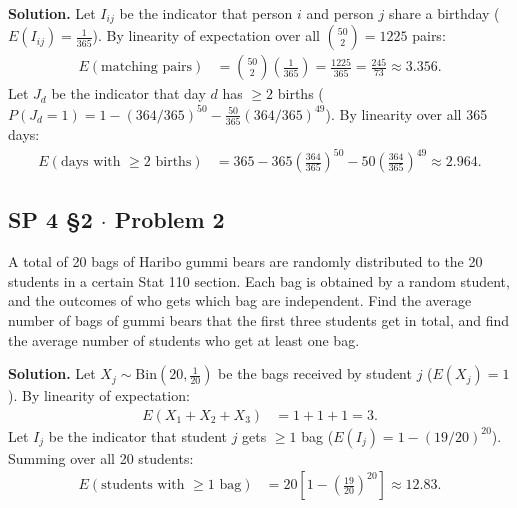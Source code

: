 \documentclass[11pt,a4paper]{article}
\begin{document}
\noindent \textbf{Solution.} Let $I_{ij}$ be the indicator that person $i$ and person $j$ share a birthday ($E(I_{ij}) = \frac{1}{365}$). By linearity of expectation over all $\binom{50}{2} = 1225$ pairs:
\begin{align*}
E(\text{matching pairs}) &= \binom{50}{2} \left(\frac{1}{365}\right) = \frac{1225}{365} = \frac{245}{73} \approx 3.356.
\end{align*}
Let $J_d$ be the indicator that day $d$ has $\ge 2$ births ($P(J_d = 1) = 1 - (364/365)^{50} - \frac{50}{365}(364/365)^{49}$). By linearity over all 365 days:
\begin{align*}
E(\text{days with } \ge 2 \text{ births}) &= 365 - 365\left(\frac{364}{365}\right)^{50} - 50\left(\frac{364}{365}\right)^{49} \approx 2.964.
\end{align*}

\vspace{10pt}
\subsection{SP 4 \S2 $\cdot$ Problem 2}
\begin{tcolorbox}[title={SP 4 \S2 $\cdot$ Problem 2}]
A total of 20 bags of Haribo gummi bears are randomly distributed to the 20 students in a certain Stat 110 section. Each bag is obtained by a random student, and the outcomes of who gets which bag are independent. Find the average number of bags of gummi bears that the first three students get in total, and find the average number of students who get at least one bag.
\end{tcolorbox}

\noindent \textbf{Solution.} Let $X_j \sim \text{Bin}\left(20, \frac{1}{20}\right)$ be the bags received by student $j$ ($E(X_j) = 1$). By linearity of expectation:
\begin{align*}
E(X_1 + X_2 + X_3) &= 1 + 1 + 1 = 3.
\end{align*}
Let $I_j$ be the indicator that student $j$ gets $\ge 1$ bag ($E(I_j) = 1 - (19/20)^{20}$). Summing over all 20 students:
\begin{align*}
E(\text{students with } \ge 1 \text{ bag}) &= 20 \left[ 1 - \left(\frac{19}{20}\right)^{20} \right] \approx 12.83.
\end{align*}

\vspace{10pt}
\end{document}
